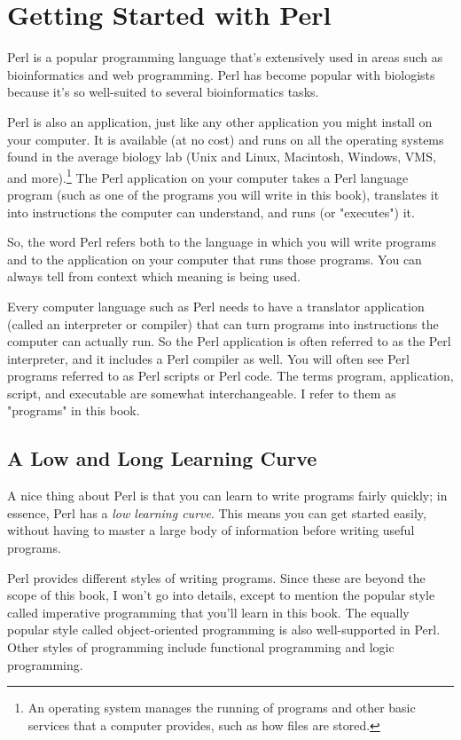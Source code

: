 \chapter{Getting Started with Perl}
\label{chap:chapter2}
\minitoc

Perl is a popular programming language that's extensively used in areas such as bioinformatics and web programming. Perl has become popular with biologists because it's so well-suited to several bioinformatics tasks.

Perl is also an application, just like any other application you might install on your computer. It is available (at no cost) and runs on all the operating systems found in the average biology lab (Unix and Linux, Macintosh, Windows, VMS, and more).\footnote{An operating system manages the running of programs and other basic services that a computer provides, such as how files are stored.} The Perl application on your computer takes a Perl language program (such as one of the programs you will write in this book), translates it into instructions the computer can understand, and runs (or "executes") it.

So, the word Perl refers both to the language in which you will write programs and to the application on your computer that runs those programs. You can always tell from context which meaning is being used.

Every computer language such as Perl needs to have a translator application (called an interpreter or compiler) that can turn programs into instructions the computer can actually run. So the Perl application is often referred to as the Perl interpreter, and it includes a Perl compiler as well. You will often see Perl programs referred to as Perl scripts or Perl code. The terms program, application, script, and executable are somewhat interchangeable. I refer to them as "programs" in this book. 

\section{A Low and Long Learning Curve}
A nice thing about Perl is that you can learn to write programs fairly quickly; in essence, Perl has a \textit{low learning curve}. This means you can get started easily, without having to master a large body of information before writing useful programs.

Perl provides different styles of writing programs. Since these are beyond the scope of this book, I won't go into details, except to mention the popular style called imperative programming that you'll learn in this book. The equally popular style called object-oriented programming is also well-supported in Perl. Other styles of programming include functional programming and logic programming.


